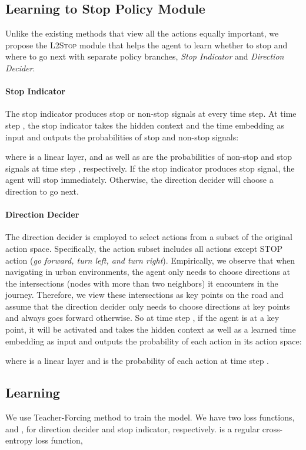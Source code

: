 \documentclass[11pt,a4paper]{article}
\begin{document}
\subsection{Learning to Stop Policy Module}
Unlike the existing methods that view all the actions equally important, 
we propose the \textsc{L2Stop} module that helps the agent to learn whether to stop and where to go next with separate policy branches, \emph{Stop Indicator} and \emph{Direction Decider}. 
\paragraph{Stop Indicator}
The stop indicator produces stop or non-stop signals at every time step. At time step , the stop indicator takes the hidden context  and the time embedding  as input and outputs the probabilities of stop and non-stop signals:

where  is a linear layer, and  as well as  are the probabilities of non-stop and stop signals at time step , respectively. If the stop indicator produces stop signal, the agent will stop immediately. Otherwise, the direction decider will choose a direction to go next.

\paragraph{Direction Decider}
The direction decider is employed to select actions from a subset of the original action space. Specifically, the action subset includes all actions except STOP action (\emph{go forward, turn left, and turn right}).
Empirically, we observe that when navigating in urban environments, the agent only needs to choose directions at the intersections (nodes with more than two neighbors) it encounters in the journey. Therefore, we view these intersections as key points on the road and assume that the direction decider only needs to choose directions at key points and always goes forward otherwise. So at time step , if the agent is at a key point, it will be activated and takes the hidden context  as well as a learned time embedding  as input and outputs the probability of each action in its action space:

where  is a linear layer and  is the probability of each action at time step .

\subsection{Learning}
 We use Teacher-Forcing \citep{luong2015effective} method to train the model. We have two loss functions,  and , for direction decider and stop indicator, respectively.  is a regular cross-entropy loss function,
\end{document}
